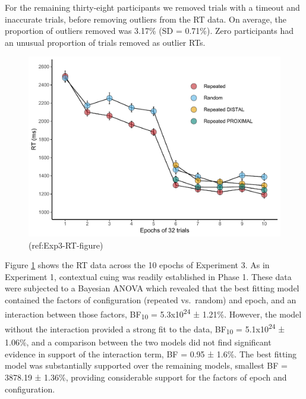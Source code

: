 \documentclass[
  man,floatsintext]{apa7}
\begin{document}
For the remaining thirty-eight participants we removed trials with a timeout and inaccurate trials, before removing outliers from the RT data. On average, the proportion of outliers removed was 3.17\% (SD = 0.71\%). Zero participants had an unusual proportion of trials removed as outlier RTs.

\begin{figure}

{\centering \includegraphics{CCC_ms1_files/figure-latex/Exp3-RT-figure-1} 

}

\caption{(ref:Exp3-RT-figure)}\label{fig:Exp3-RT-figure}
\end{figure}

Figure \ref{fig:Exp3-RT-figure} shows the RT data across the 10 epochs of Experiment 3. As in Experiment 1, contextual cuing was readily established in Phase 1. These data were subjected to a Bayesian ANOVA which revealed that the best fitting model contained the factors of configuration (repeated vs.~random) and epoch, and an interaction between those factors, BF\textsubscript{10} = 5.3x10\textsuperscript{24} ± 1.21\%. However, the model without the interaction provided a strong fit to the data, BF\textsubscript{10} = 5.1x10\textsuperscript{24} ± 1.06\%, and a comparison between the two models did not find significant evidence in support of the interaction term, BF = 0.95 ± 1.6\%. The best fitting model was substantially supported over the remaining models, smallest BF = 3878.19 ± 1.36\%, providing considerable support for the factors of epoch and configuration.
\end{document}
